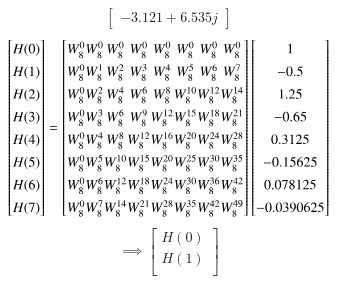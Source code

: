 \documentclass[journal,12pt,twocolumn]{IEEEtran}
\renewcommand\thesection{\arabic{section}}
\begin{document}
\begin{enumerate}[label=\thesection.\arabic*.,ref=\thesection.\theenumi]
\begin{equation}
\begin{bmatrix}
-3.121 + 6.535j
\end{bmatrix}
\end{equation}
\begin{equation}
\renewcommand{\arraystretch}{1.35}
\setlength\arraycolsep{0.05pt}
\begin{bmatrix}
H(0) \\
H(1) \\
H(2) \\
H(3) \\
H(4) \\
H(5) \\
H(6) \\
H(7)
\end{bmatrix}
=
\begin{bmatrix}
W^{0}_{8} & W^{0}_{8} & W^{0}_{8} & W^{0}_{8} & W^{0}_{8} & W^{0}_{8} & W^{0}_{8} & W^{0}_{8}\\
W^{0}_{8} & W^{1}_{8} & W^{2}_{8} & W^{3}_{8} & W^{4}_{8} & W^{5}_{8} & W^{6}_{8} & W^{7}_{8}\\
W^{0}_{8} & W^{2}_{8} & W^{4}_{8} & W^{6}_{8} & W^{8}_{8} & W^{10}_{8} & W^{12}_{8} & W^{14}_{8}\\
W^{0}_{8} & W^{3}_{8} & W^{6}_{8} & W^{9}_{8} & W^{12}_{8} & W^{15}_{8} & W^{18}_{8} & W^{21}_{8}\\
W^{0}_{8} & W^{4}_{8} & W^{8}_{8} & W^{12}_{8} & W^{16}_{8} & W^{20}_{8} & W^{24}_{8} & W^{28}_{8}\\
W^{0}_{8} & W^{5}_{8} & W^{10}_{8} & W^{15}_{8} & W^{20}_{8} & W^{25}_{8} & W^{30}_{8} & W^{35}_{8}\\
W^{0}_{8} & W^{6}_{8} & W^{12}_{8} & W^{18}_{8} & W^{24}_{8} & W^{30}_{8} & W^{36}_{8} & W^{42}_{8}\\
W^{0}_{8} & W^{7}_{8} & W^{14}_{8} & W^{21}_{8} & W^{28}_{8} & W^{35}_{8} & W^{42}_{8} & W^{49}_{8}
\end{bmatrix}
\begin{bmatrix}
1 \\
-0.5 \\
1.25 \\
-0.65 \\
0.3125 \\
-0.15625 \\
0.078125 \\
-0.0390625
\end{bmatrix}
\end{equation}
\begin{equation}
\implies
\begin{bmatrix}
H(0) \\
H(1) \\

\end{bmatrix}
\end{equation}
\end{enumerate}
\end{document}
